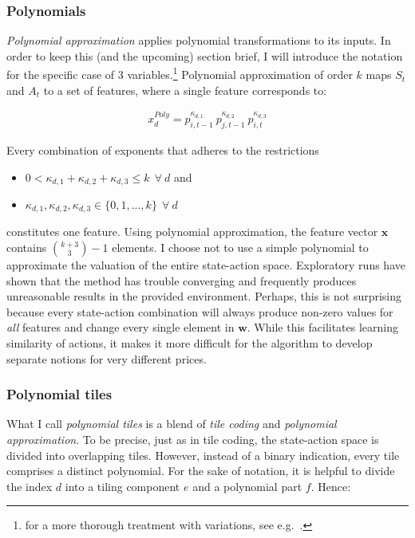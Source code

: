 \subsubsection{Polynomials}\label{polynomial}

\emph{Polynomial approximation} applies polynomial transformations to its inputs. In order to keep this (and the upcoming) section brief, I will introduce the notation for the specific case of 3 variables.\footnote{for a more thorough treatment with variations, see e.g.\ \textcite{hastie_basis_2009}.} Polynomial approximation of order $k$ maps $S_t$ and $A_t$ to a set of features, where a single feature corresponds to:


\begin{gather}\label{polynomial_extraction}
x_d^{Poly} = p_{i, t-1}^{\kappa_{d,1}} ~ p_{j, t-1}^{\kappa_{d,2}} ~ p_{i, t}^{\kappa_{d,3}}
\end{gather}


Every combination of exponents that adheres to the restrictions

\begin{itemize}
	\item $0 < \kappa_{d,1} + \kappa_{d,2} + \kappa_{d,3} \leq k  ~~ \forall ~ d$ and
	\item $\kappa_{d,1}, \kappa_{d,2}, \kappa_{d,3} \in \{0, 1, ..., k\} ~~  \forall ~ d$
\end{itemize}

constitutes one feature. Using polynomial approximation, the feature vector $\boldsymbol{x}$ contains ${k + 3\choose3}  - 1$ elements. I choose not to use a simple polynomial to approximate the valuation of the entire state-action space. Exploratory runs have shown that the method has trouble converging and frequently produces unreasonable results in the provided environment. Perhaps, this is not surprising because every state-action combination will always produce non-zero values for \emph{all} features and change every single element in $\boldsymbol{w}$. While this facilitates learning similarity of actions, it makes it more difficult for the algorithm to develop separate notions for very different prices.

\subsubsection{Polynomial tiles}

What I call \emph{polynomial tiles} is a blend of \emph{tile coding} and \emph{polynomial approximation}. To be precise, just as in tile coding, the state-action space is divided into overlapping tiles. However, instead of a binary indication, every tile comprises a distinct polynomial. For the sake of notation, it is helpful to divide the index $d$ into a tiling component $e$ and a polynomial part $f$. Hence:

